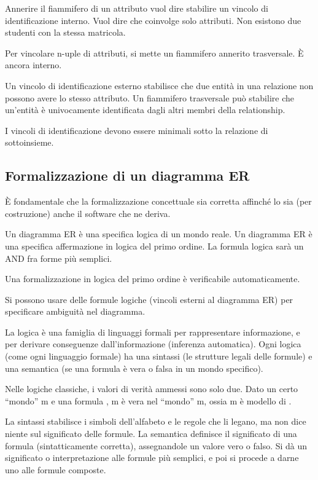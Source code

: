 Annerire il fiammifero di un attributo vuol dire stabilire un vincolo di identificazione interno. Vuol dire che coinvolge solo attributi. Non esistono due studenti con la stessa matricola.

Per vincolare n-uple di attributi, si mette un fiammifero annerito trasversale. \`E ancora interno.

Un vincolo di identificazione esterno stabilisce che due entit\`a in una relazione non possono avere lo stesso attributo. Un fiammifero trasversale pu\`o stabilire che un'entit\`a \`e univocamente identificata dagli altri membri della relationship.

I vincoli di identificazione devono essere minimali sotto la relazione di sottoinsieme.

\subsection{Formalizzazione di un diagramma ER}

\`E fondamentale che la formalizzazione concettuale sia corretta affinch\'e lo sia (per costruzione) anche il software che ne deriva.

Un diagramma ER \`e una specifica logica di un mondo reale. Un diagramma ER \`e una specifica affermazione in logica del primo ordine. La formula logica sar\`a un AND fra forme pi\`u semplici.

Una formalizzazione in logica del primo ordine \`e verificabile automaticamente.

Si possono usare delle formule logiche (vincoli esterni al diagramma ER) per specificare ambiguit\`a nel diagramma.

La logica \`e una famiglia di linguaggi formali per rappresentare informazione, e per derivare conseguenze dall'informazione (inferenza automatica). Ogni logica (come ogni linguaggio formale) ha una sintassi (le strutture legali delle formule) e una semantica (se una formula \`e vera o falsa in un mondo specifico).

Nelle logiche classiche, i valori di verit\`a ammessi sono solo due. Dato un certo ``mondo'' m e una formula \varphi, m \models \varphi \iff \varphi \`e vera nel ``mondo'' m, ossia m \`e modello di \varphi.

La sintassi stabilisce i simboli dell'alfabeto e le regole che li legano, ma non dice niente sul significato delle formule. La semantica definisce il significato di una formula (sintatticamente corretta), assegnandole un valore vero o falso. Si d\`a un significato o interpretazione alle formule pi\`u semplici, e poi si procede a darne uno alle formule composte.

